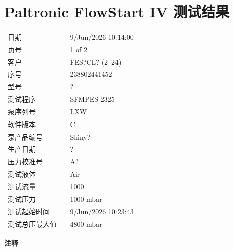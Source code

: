 \documentclass[UTF8,10pt,a4paper,fontset=fandol]{ctexart}
\newcommand{\fieldvalue}[1]{#1}
\begin{document}
\newpage

\section{Paltronic FlowStart IV 测试结果}

\begin{tabular}{@{}p{0.28\linewidth}p{0.62\linewidth}@{}}
日期 &
\fieldvalue{9/Jun/2026 10:14:00}
\\
页号 &
\fieldvalue{1 of 2}
\\
客户 &
\fieldvalue{FES?CL? (2--24)}
\\
序号 &
\fieldvalue{238802441452}
\\
型号 &
\fieldvalue{?}
\\
测试程序 &
\fieldvalue{SFMPES-2325}
\\
泵序列号 &
\fieldvalue{LXW}
\\
软件版本 &
\fieldvalue{C}
\\
泵产品编号 &
\fieldvalue{Shiny?}
\\
生产日期 &
\fieldvalue{?}
\\
压力校准号 &
\fieldvalue{A?}
\\
测试液体 &
\fieldvalue{Air}
\\
测试流量 &
\fieldvalue{1000}
\\
测试压力 &
\fieldvalue{1000 mbar}
\\
测试起始时间 &
\fieldvalue{9/Jun/2026 10:23:43}
\\
测试总压最大值 &
\fieldvalue{4800 mbar}
\\
\end{tabular}

\medskip
\noindent\textbf{注释}
\end{document}
